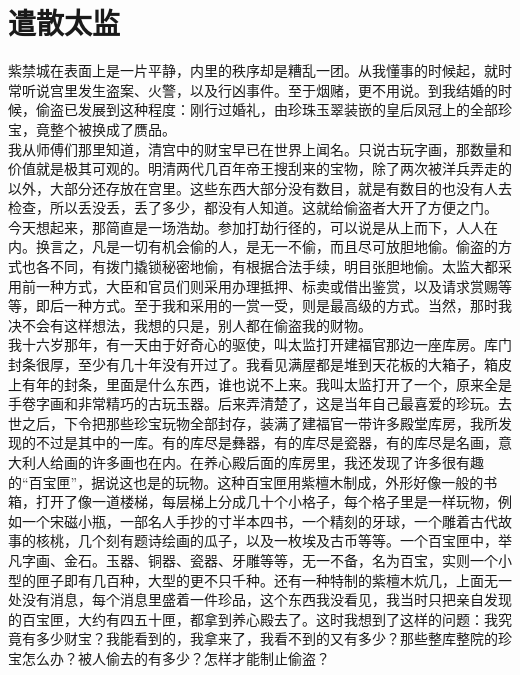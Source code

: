 \fancyhead[RO]{} %
\fancyhead[LE]{} %
\chapter*{遣散太监}
\thispagestyle{empty}
紫禁城在表面上是一片平静，内里的秩序却是糟乱一团。从我懂事的时候起，就时常听说宫里发生盗案、火警，以及行凶事件。至于烟赌，更不用说。到我结婚的时候，偷盗已发展到这种程度：刚行过婚礼，由珍珠玉翠装嵌的皇后凤冠上的全部珍宝，竟整个被换成了赝品。\\

我从师傅们那里知道，清宫中的财宝早已在世界上闻名。只说古玩字画，那数量和价值就是极其可观的。明清两代几百年帝王搜刮来的宝物，除了两次被洋兵弄走的以外，大部分还存放在宫里。这些东西大部分没有数目，就是有数目的也没有人去检查，所以丢没丢，丢了多少，都没有人知道。这就给偷盗者大开了方便之门。\\

今天想起来，那简直是一场浩劫。参加打劫行径的，可以说是从上而下，人人在内。换言之，凡是一切有机会偷的人，是无一不偷，而且尽可放胆地偷。偷盗的方式也各不同，有拨门撬锁秘密地偷，有根据合法手续，明目张胆地偷。太监大都采用前一种方式，大臣和官员们则采用办理抵押、标卖或借出鉴赏，以及请求赏赐等等，即后一种方式。至于我和采用的一赏一受，则是最高级的方式。当然，那时我决不会有这样想法，我想的只是，别人都在偷盗我的财物。\\

我十六岁那年，有一天由于好奇心的驱使，叫太监打开建福官那边一座库房。库门封条很厚，至少有几十年没有开过了。我看见满屋都是堆到天花板的大箱子，箱皮上有年的封条，里面是什么东西，谁也说不上来。我叫太监打开了一个，原来全是手卷字画和非常精巧的古玩玉器。后来弄清楚了，这是当年自己最喜爱的珍玩。去世之后，下令把那些珍宝玩物全部封存，装满了建福官一带许多殿堂库房，我所发现的不过是其中的一库。有的库尽是彝器，有的库尽是瓷器，有的库尽是名画，意大利人给画的许多画也在内。在养心殿后面的库房里，我还发现了许多很有趣的“百宝匣”，据说这也是的玩物。这种百宝匣用紫檀木制成，外形好像一般的书箱，打开了像一道楼梯，每层梯上分成几十个小格子，每个格子里是一样玩物，例如一个宋磁小瓶，一部名人手抄的寸半本四书，一个精刻的牙球，一个雕着古代故事的核桃，几个刻有题诗绘画的瓜子，以及一枚埃及古币等等。一个百宝匣中，举凡字画、金石。玉器、铜器、瓷器、牙雕等等，无一不备，名为百宝，实则一个小型的匣子即有几百种，大型的更不只千种。还有一种特制的紫檀木炕几，上面无一处没有消息，每个消息里盛着一件珍品，这个东西我没看见，我当时只把亲自发现的百宝匣，大约有四五十匣，都拿到养心殿去了。这时我想到了这样的问题：我究竟有多少财宝？我能看到的，我拿来了，我看不到的又有多少？那些整库整院的珍宝怎么办？被人偷去的有多少？怎样才能制止偷盗？\\

